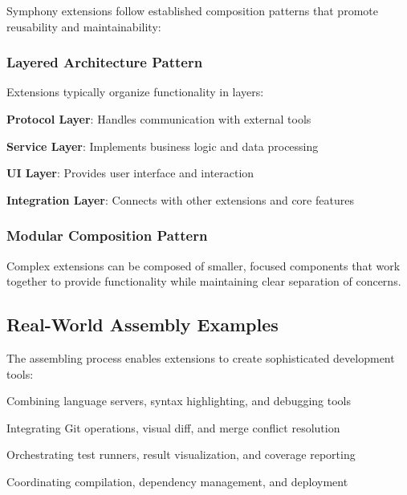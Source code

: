 Symphony extensions follow established composition patterns that promote reusability and maintainability:

\subsubsection*{Layered Architecture Pattern}

Extensions typically organize functionality in layers:

\begin{compactlist}
    \item \textbf{Protocol Layer}: Handles communication with external tools
    \item \textbf{Service Layer}: Implements business logic and data processing
    \item \textbf{UI Layer}: Provides user interface and interaction
    \item \textbf{Integration Layer}: Connects with other extensions and core features
\end{compactlist}

\subsubsection*{Modular Composition Pattern}

Complex extensions can be composed of smaller, focused components that work together to provide functionality while maintaining clear separation of concerns.

\subsection*{Real-World Assembly Examples}

The assembling process enables extensions to create sophisticated development tools:

\begin{description}[leftmargin=4cm,labelwidth=3.5cm]
    \item[\textbf{Language Support}] Combining language servers, syntax highlighting, and debugging tools
    \item[\textbf{Source Control}] Integrating Git operations, visual diff, and merge conflict resolution
    \item[\textbf{Testing Frameworks}] Orchestrating test runners, result visualization, and coverage reporting
    \item[\textbf{Build Systems}] Coordinating compilation, dependency management, and deployment
\end{description}

